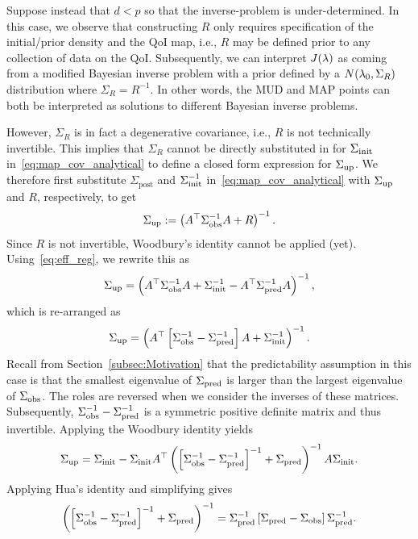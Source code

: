 Suppose instead that $d<p$ so that the inverse-problem is under-determined.
In this case, we observe that constructing $R$ only requires specification of the initial/prior density and the QoI map, i.e., $R$ may be defined prior to any collection of data on the QoI.
Subsequently, we can interpret $J(\lambda)$ as coming from a modified Bayesian inverse problem with a prior defined by a $N(\lambda_0,\Sigma_R)$ distribution where $\Sigma_R=R^{-1}$.
In other words, the MUD and MAP points can both be interpreted as solutions to different Bayesian inverse problems.

However, $\Sigma_R$ is in fact a degenerative covariance, i.e., $R$ is not technically invertible.
This implies that $\Sigma_R$ cannot be directly substituted in for $\Sigma_\text{init}$ in~\eqref{eq:map_cov_analytical} to define a closed form expression for $\Sigma_\text{up}$.
We therefore first substitute  $\Sigma_\text{post}$ and $\Sigma_\text{init}^{-1}$ in~\eqref{eq:map_cov_analytical} with $\Sigma_\text{up}$  and $R$, respectively, to get
\begin{equation}
	\Sigma_\text{up} := \left(A^\top \Sigma_\text{obs}^{-1} A + R\right)^{-1}.
\end{equation}
Since $R$ is not invertible, Woodbury's identity cannot be applied (yet).
Using~\eqref{eq:eff_reg}, we rewrite this as
\begin{equation}
	\updatedCov = \left(A^\top \observedCov^{-1} A +  \initialCov^{-1} - \nolinebreak A^\top \predictedCov^{-1} A\right)^{-1},
\end{equation}
which is re-arranged as
\begin{equation}
	\Sigma_\text{up} = \left(A^\top \left[\Sigma_\text{obs}^{-1} - \Sigma_\text{pred}^{-1}\right]A + \Sigma_\text{init}^{-1}\right)^{-1}.
\end{equation}
Recall from Section~\ref{subsec:Motivation} that the predictability assumption in this case is that the smallest eigenvalue of $\Sigma_\text{pred}$ is larger than the largest eigenvalue of $\Sigma_\text{obs}$.
The roles are reversed when we consider the inverses of these matrices.
Subsequently, $\Sigma_\text{obs}^{-1}-\Sigma_\text{pred}^{-1}$ is a symmetric positive definite matrix and thus invertible.
Applying the Woodbury identity yields
\begin{equation}\label{eq:updated_cov_almost}
	\Sigma_\text{up} = \Sigma_\text{init} - \Sigma_\text{init} A^\top\left( \left[\Sigma_\text{obs}^{-1} - \Sigma_\text{pred}^{-1}\right]^{-1} + \Sigma_\text{pred}\right)^{-1} A\Sigma_\text{init}.
\end{equation}
Applying Hua's identity and simplifying gives
\begin{equation}\label{eq:Hua}
	\left( \left[\Sigma_\text{obs}^{-1} - \Sigma_\text{pred}^{-1}\right]^{-1} + \Sigma_\text{pred}\right)^{-1} = \Sigma_\text{pred}^{-1}\left[\Sigma_\text{pred} - \Sigma_\text{obs}\right]\Sigma_\text{pred}^{-1}.
\end{equation}
